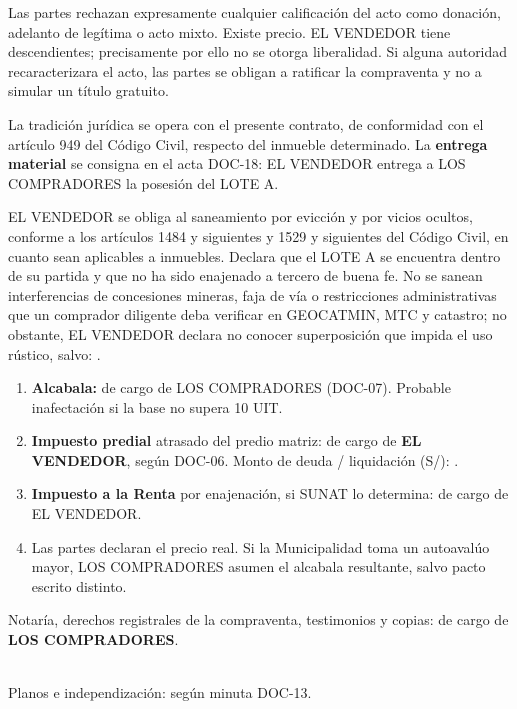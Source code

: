 \documentclass[12pt,a4paper]{article}
\begin{document}
Las partes rechazan expresamente cualquier calificación del acto como donación, adelanto de legítima o acto mixto. Existe precio. EL VENDEDOR tiene descendientes; precisamente por ello no se otorga liberalidad. Si alguna autoridad recaracterizara el acto, las partes se obligan a ratificar la compraventa y no a simular un título gratuito.

La tradición jurídica se opera con el presente contrato, de conformidad con el artículo 949 del Código Civil, respecto del inmueble determinado. La \textbf{entrega material} se consigna en el acta DOC-18: EL VENDEDOR entrega a LOS COMPRADORES la posesión del LOTE A.

EL VENDEDOR se obliga al saneamiento por evicción y por vicios ocultos, conforme a los artículos 1484 y siguientes y 1529 y siguientes del Código Civil, en cuanto sean aplicables a inmuebles. Declara que el LOTE A se encuentra dentro de su partida y que no ha sido enajenado a tercero de buena fe. No se sanean interferencias de concesiones mineras, faja de vía o restricciones administrativas que un comprador diligente deba verificar en GEOCATMIN, MTC y catastro; no obstante, EL VENDEDOR declara no conocer superposición que impida el uso rústico, salvo: .

\begin{enumerate}[leftmargin=1.15cm]
\item \textbf{Alcabala:} de cargo de LOS COMPRADORES (DOC-07). Probable inafectación si la base no supera 10 UIT.
\item \textbf{Impuesto predial} atrasado del predio matriz: de cargo de \textbf{EL VENDEDOR}, según DOC-06. Monto de deuda / liquidación (S/): \DeudaPredialReferencia.
\item \textbf{Impuesto a la Renta} por enajenación, si SUNAT lo determina: de cargo de EL VENDEDOR.
\item Las partes declaran el precio real. Si la Municipalidad toma un autoavalúo mayor, LOS COMPRADORES asumen el alcabala resultante, salvo pacto escrito distinto.
\end{enumerate}

Notaría, derechos registrales de la compraventa, testimonios y copias: de cargo de \textbf{LOS COMPRADORES}.

\vspace{0.15em}
\\[0.25em]
Planos e independización: según minuta DOC-13.
\end{document}
